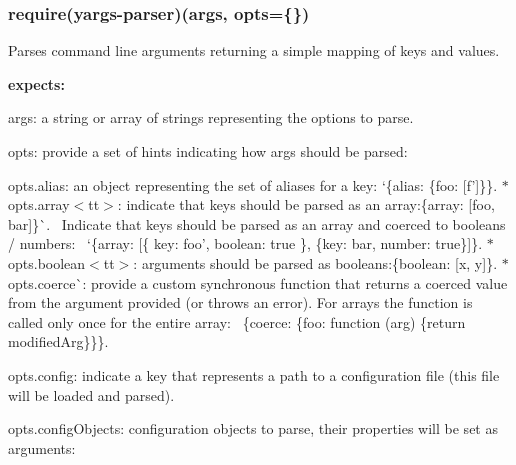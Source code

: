 \subsubsection*{require(\textquotesingle{}yargs-\/parser\textquotesingle{})(args, opts=\{\})}

Parses command line arguments returning a simple mapping of keys and values.

{\bfseries expects\+:}


\begin{DoxyItemize}
\item {\ttfamily args}\+: a string or array of strings representing the options to parse.
\item {\ttfamily opts}\+: provide a set of hints indicating how {\ttfamily args} should be parsed\+:
\begin{DoxyItemize}
\item {\ttfamily opts.\+alias}\+: an object representing the set of aliases for a key\+: `\{alias\+: \{foo\+: \mbox{[}\textquotesingle{}f'\mbox{]}\}\}{\ttfamily . $\ast$}opts.\+array$<$tt$>$\+: indicate that keys should be parsed as an array\+:\{array\+: \mbox{[}\textquotesingle{}foo\textquotesingle{}, \textquotesingle{}bar\textquotesingle{}\mbox{]}\}\`{}.~\newline
 Indicate that keys should be parsed as an array and coerced to booleans / numbers\+:~\newline
 `\{array\+: \mbox{[}\{ key\+: \textquotesingle{}foo', boolean\+: true \}, \{key\+: \textquotesingle{}bar\textquotesingle{}, number\+: true\}\mbox{]}\}{\ttfamily . $\ast$}opts.\+boolean$<$tt$>$\+: arguments should be parsed as booleans\+:\{boolean\+: \mbox{[}\textquotesingle{}x\textquotesingle{}, \textquotesingle{}y\textquotesingle{}\mbox{]}\}{\ttfamily . $\ast$}opts.\+coerce\`{}\+: provide a custom synchronous function that returns a coerced value from the argument provided (or throws an error). For arrays the function is called only once for the entire array\+:~\newline
 {\ttfamily \{coerce\+: \{foo\+: function (arg) \{return modified\+Arg\}\}\}}.
\item {\ttfamily opts.\+config}\+: indicate a key that represents a path to a configuration file (this file will be loaded and parsed).
\item {\ttfamily opts.\+config\+Objects}\+: configuration objects to parse, their properties will be set as arguments\+:~\newline

\end{DoxyItemize}
\end{DoxyItemize}
